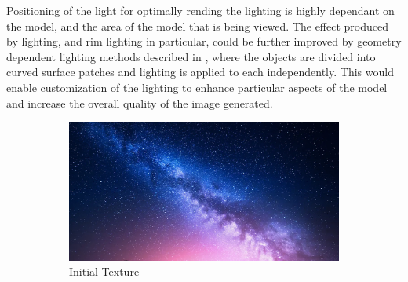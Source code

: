 


Positioning of the light for optimally rending the lighting is highly dependant on the model, and the area of the model that is being viewed. The effect produced by lighting, and rim lighting in particular, could be further improved by geometry dependent lighting methods described in \cite{lee06}, where the objects are divided into curved surface patches and lighting is applied to each independently. This would enable customization of the lighting to enhance particular aspects of the model and increase the overall quality of the image generated.

\begin{figure}[h]
    \centering
        \begin{subfigure}[b]{0.4\textwidth}
        \includegraphics[width=\textwidth]{img/textures/space.png}
        \caption{Initial Texture}
        \label{fig:OriginalSkull}
    \end{subfigure}
    ~
    \centering
    \begin{subfigure}[b]{0.2\textwidth}

\end{subfigure}
\end{figure}
